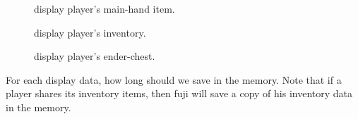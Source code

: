 
\begin{description}
    \item [] display player's main-hand item.
    \item[] display player's inventory.
    \item[] display player's ender-chest.
\end{description}


For each display data, how long should we save in the memory.
Note that if a player shares its inventory items, then fuji will save a copy of his inventory data in the memory.